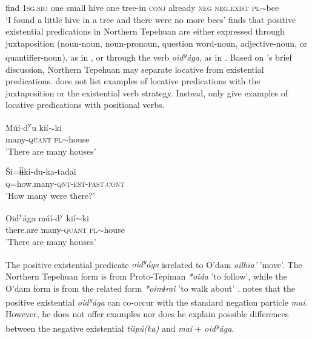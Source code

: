 \documentclass[output=paper]{langsci/langscibook}
\begin{document}
find	\textsc{1sg.sbj}	one	small	hive	one	tree-in		\textsc{conj}	already		\textsc{neg}	\textsc{neg.exist}	\textsc{pl}$\sim$bee\\
\glt ‘I found a little hive in a tree and there were no more bees’ \citep[15]{bascomm1998}
\z 
\citet{bascom1982} finds that positive existential predications in Northern Tepehuan are either expressed through juxtaposition (noun-noun, noun-pronoun, question word-noun, adjective-noun, or quantifier-noun), as in , or through the verb \emph{oid\textsuperscript{y}ága}, as in . Based on \citet{bascom1982}'s brief discussion, Northern Tepehuan may separate locative from existential predications. \citet{bascom1982} does not list examples of locative predications with the juxtaposition or the existential verb strategy. Instead, \citet{bascom1982} only give examples of locative predications with positional verbs.
\ea
\label{ex:odam-juxta}
\begin{xlist}
\item\gll Múí-d\textsuperscript{y}u kií$\sim$ki\\
many-\textsc{quant} \textsc{pl}$\sim$house\\
\glt 'There are many houses' \citep[281]{bascom1982}
\item\gll Ši=ɨ́ɨ́ki-du-ka-tadai\\
\textsc{q}=how.many-\textsc{qnt-est-past.cont}\\
\glt 'How many were there?' \citep[282]{bascom1982}
\end{xlist}
\z 
\ea
\label{ex:odam-oidag}
\begin{xlist}
\item\gll Oid\textsuperscript{y}ága múí-d\textsuperscript{y} kií$\sim$ki\\
there.are many-\textsc{quant} \textsc{pl}$\sim$house\\
\glt 'There are many houses' \citep[282]{bascom1982}
\end{xlist}
\z
The positive existential predicate \emph{oid\textsuperscript{y}ága} isrelated to O'dam \emph{oilhia'} 'move'. The Northern Tepehuan form is from Proto-Tepiman \emph{*oida} 'to follow', while the O'dam form is from the related form \emph{*oimɨrai} 'to walk about' \citep{hill2014}. \citet[281]{bascom1982} notes that the positive existential \emph{oid\textsuperscript{y}ága} can co-occur with the standard negation particle \emph{mai}. However, he does not offer examples nor does he explain possible differences between the negative existential \emph{tiipú(ka)} and \emph{mai} + \emph{oid\textsuperscript{y}ága}.
\end{document}
